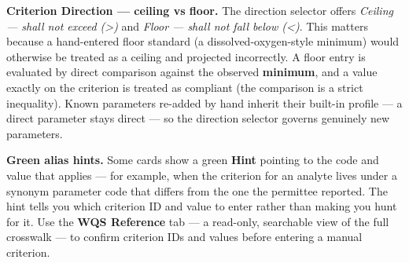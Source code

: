 \documentclass[
  11pt,
  letterpaper,
  DIV=11,
  numbers=noendperiod]{scrartcl}
\begin{document}
\begin{tcolorbox}[enhanced jigsaw, arc=.35mm, bottomrule=.15mm, bottomtitle=1mm, breakable, colback=white, colbacktitle=quarto-callout-note-color!10!white, colframe=quarto-callout-note-color-frame, coltitle=black, left=2mm, leftrule=.75mm, opacityback=0, opacitybacktitle=0.6, rightrule=.15mm, title=\textcolor{quarto-callout-note-color}{\faInfo}\hspace{0.5em}{Note}, titlerule=0mm, toprule=.15mm, toptitle=1mm]

\textbf{Criterion Direction --- ceiling vs floor.} The direction
selector offers \emph{Ceiling --- shall not exceed (\textgreater)} and
\emph{Floor --- shall not fall below (\textless)}. This matters because
a hand-entered floor standard (a dissolved-oxygen-style minimum) would
otherwise be treated as a ceiling and projected incorrectly. A floor
entry is evaluated by direct comparison against the observed
\textbf{minimum}, and a value exactly on the criterion is treated as
compliant (the comparison is a strict inequality). Known parameters
re-added by hand inherit their built-in profile --- a direct parameter
stays direct --- so the direction selector governs genuinely new
parameters.

\end{tcolorbox}

\begin{tcolorbox}[enhanced jigsaw, arc=.35mm, bottomrule=.15mm, bottomtitle=1mm, breakable, colback=white, colbacktitle=quarto-callout-note-color!10!white, colframe=quarto-callout-note-color-frame, coltitle=black, left=2mm, leftrule=.75mm, opacityback=0, opacitybacktitle=0.6, rightrule=.15mm, title=\textcolor{quarto-callout-note-color}{\faInfo}\hspace{0.5em}{Note}, titlerule=0mm, toprule=.15mm, toptitle=1mm]

\textbf{Green alias hints.} Some cards show a green \textbf{Hint}
pointing to the code and value that applies --- for example, when the
criterion for an analyte lives under a synonym parameter code that
differs from the one the permittee reported. The hint tells you which
criterion ID and value to enter rather than making you hunt for it. Use
the \textbf{WQS Reference} tab --- a read-only, searchable view of the
full crosswalk --- to confirm criterion IDs and values before entering a
manual criterion.

\end{tcolorbox}
\end{document}
